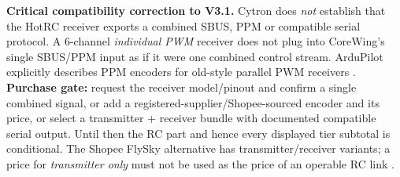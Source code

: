 \textbf{Critical compatibility correction to V3.1.} Cytron does \emph{not} establish that the HotRC receiver exports a combined SBUS, PPM or compatible serial protocol. A 6-channel \emph{individual PWM} receiver does not plug into CoreWing's single SBUS/PPM input as if it were one combined control stream. ArduPilot explicitly describes PPM encoders for old-style parallel PWM receivers \cite{hotrcCurrent,coreDoc,rcPWMEncoder}. \textbf{Purchase gate:} request the receiver model/pinout and confirm a single combined signal, or add a registered-supplier/Shopee-sourced encoder and its price, or select a transmitter + receiver bundle with documented compatible serial output. Until then the RC part and hence every displayed tier subtotal is conditional. The Shopee FlySky alternative has transmitter/receiver variants; a price for \emph{transmitter only} must not be used as the price of an operable RC link \cite{flyShop,rcProtocols}.

